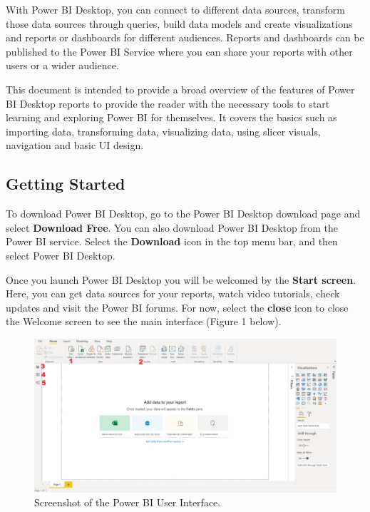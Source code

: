 \documentclass[
]{book}
\begin{document}
With Power BI Desktop, you can connect to different data sources, transform those data sources through queries, build data models and create visualizations and reports or dashboards for different audiences. Reports and dashboards can be published to the Power BI Service where you can share your reports with other users or a wider audience.

This document is intended to provide a broad overview of the features of Power BI Desktop reports to provide the reader with the necessary tools to start learning and exploring Power BI for themselves. It covers the basics such as importing data, transforming data, visualizing data, using slicer visuals, navigation and basic UI design.

\hypertarget{getting-started}{%
\subsection{Getting Started}\label{getting-started}}

To download Power BI Desktop, go to the Power BI Desktop download page and select \textbf{Download Free}. You can also download Power BI Desktop from the Power BI service. Select the \textbf{Download} icon in the top menu bar, and then select Power BI Desktop.

Once you launch Power BI Desktop you will be welcomed by the \textbf{Start screen}. Here, you can get data sources for your reports, watch video tutorials, check updates and visit the Power BI forums. For now, select the \textbf{close} icon to close the Welcome screen to see the main interface (Figure 1 below).

\begin{figure}
\centering
\includegraphics{bi1.jpg}
\caption{Screenshot of the Power BI User Interface.}
\end{figure}
\end{document}
